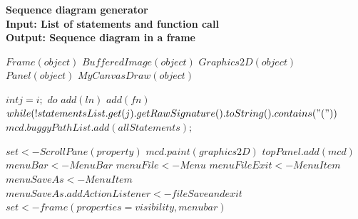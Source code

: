 \begin{algorithm}
	{\textbf{Sequence diagram generator}}\\	
	\noindent\makebox[\linewidth]{\rule{\textwidth}{0.4pt}}
	{\textbf{Input: List of statements and function call}} \\
	{\textbf{Output: Sequence diagram in a frame}}
	\begin{algorithmic}[1]
		
		    \State $ Frame (object)  $  
			\State $ BufferedImage (object)  $ 
			\State $ Graphics2D(object) $ 
			\State $ Panel (object)$ 
			\State $ MyCanvasDraw(object )  $ 
					
					\State $int j=i;$
						\State $do$
						\State $add(ln)$ 
						\State $add(fn)$ 
						\State $while(!statementsList.get(j).getRawSignature().toString().contains("("))$
						\State $mcd.buggyPathList.add(allStatements);$ 
					\EndIf				
				\EndIf		
				
			\EndFor
				\State $set <- ScrollPane(property)$ 
				\State $mcd.paint(graphics2D)$ 
				\State $topPanel.add(mcd)$ 	
				\State $menuBar <- MenuBar$ 
				\State $menuFile <- Menu $
				\State $menuFileExit <- MenuItem$ 
				\State $menuSaveAs <- MenuItem $ 
				\State $menuSaveAs.addActionListener <- fileSave and exit$
				\State $set<-frame (properties=visibility,menubar)$
		
		\EndFunction		
		
	\end{algorithmic}
	\noindent\makebox[\linewidth]{\rule{\textwidth}{0.4pt}}
\end{algorithm}
